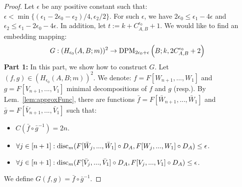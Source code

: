 \documentclass{article} %
\newcommand{\disc}{\textnormal{disc}}
\begin{document}
\begin{proof} Let $\epsilon$ be any positive constant such that: $\epsilon < \min\{(\epsilon_1 - 2\epsilon_0 - \epsilon_2)/4,\epsilon_2/2 \}$. For such $\epsilon$, we have $2\epsilon_0 \leq \epsilon_1 - 4\epsilon$ and $\epsilon_2 \leq \epsilon_1 - 2 \epsilon_0 - 4\epsilon$. In addition, let $t := k+C^{\epsilon_0}_{A,B}+1$. We would like to find an embedding mapping:
\begin{equation}
G : (H_{\epsilon_0}(A,B;m))^2 \rightarrow \textnormal{DPM}_{2\epsilon_0+\epsilon}\left(B;k,2C^{\epsilon_0}_{A,B}+2 \right)
\end{equation}
\textbf{Part 1:} In this part, we show how to construct $G$. Let $(f,g) \in (H_{\epsilon_0}(A,B;m))^2$. We denote: $f = F[W_{n+1},...,W_1]$ and $g = F[V_{n+1},...,V_1]$ minimal decompositions of $f$ and $g$ (resp.). By Lem.~\ref{lem:approxFunc}, there are functions $\bar{f} = F[\bar{W}_{n+1},...,\bar{W}_1]$ and $\bar{g} = F[\bar{V}_{n+1},...,\bar{V}_1]$ such that:
\begin{itemize}
\item $C(\bar{f} \circ \bar{g}^{-1}) = 2n$.
\item $\forall j \in [n+1]: \disc_m(F[\bar{W}_{j},...,\bar{W}_1] \circ D_A,F[W_{j},...,W_1] \circ D_A) \leq \epsilon$.
\item $\forall j \in [n+1]: \disc_m(F[\bar{V}_{j},...,\bar{V}_1] \circ D_A,F[V_{j},...,V_1] \circ D_A) \leq \epsilon$.
\end{itemize}
We define $G(f,g) = \bar{f} \circ \bar{g}^{-1}$.


\end{proof}
\end{document}
